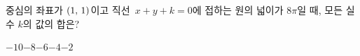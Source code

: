중심의 좌표가 $(1,\mkern3mu 1)$이고 직선~$x+y+k=0$에 접하는 원의 넓이가 $8\pi$일 때, 모든 실수 $k$의 값의 합은?
\begin{choices32}{$-10$}{$-8$}{$-6$}{$-4$}{$-2$}\end{choices32}

